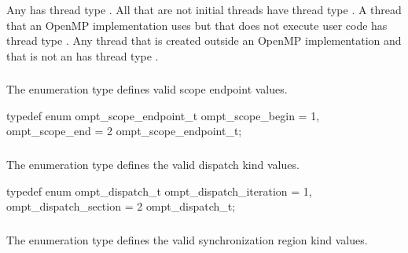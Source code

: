 \descr
Any  has thread type .
All  that are not initial threads have thread
type . A thread that an OpenMP implementation 
uses but that does not execute user code has thread type .  
Any thread that is created outside an OpenMP implementation and that is not an 
 has thread type .



\subsubsection{}
\label{sec:ompt_scope_endpoint_t}

\summary
The  enumeration type defines valid scope endpoint values.

\format
\begin{ccppspecific}
\begin{omptEnum}
typedef enum ompt_scope_endpoint_t {
  ompt_scope_begin                    = 1,
  ompt_scope_end                      = 2
} ompt_scope_endpoint_t;
\end{omptEnum}
\end{ccppspecific}



\subsubsection{}
\label{sec:ompt_dispatch_t}

\summary
The  enumeration type defines the valid dispatch kind values.

\format
\begin{ccppspecific}
\begin{omptEnum}
typedef enum ompt_dispatch_t {
  ompt_dispatch_iteration             = 1,
  ompt_dispatch_section               = 2
} ompt_dispatch_t;
\end{omptEnum}
\end{ccppspecific}



\subsubsection{}
\label{sec:ompt_sync_region_t}

\summary
The  enumeration type defines the valid 
synchronization region kind values.

